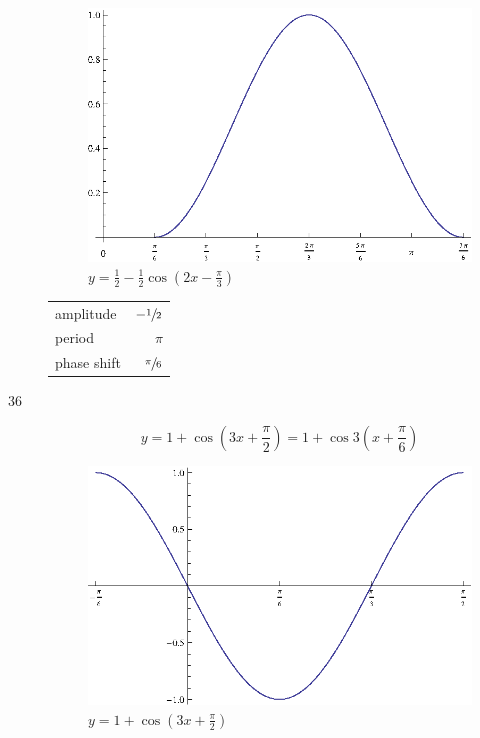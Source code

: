 \documentclass{exam}
\begin{document}
\begin{description}
        \begin{figure}[H]
          \centering
          \includegraphics[scale=1.0]{exercise35.eps}
          \caption{$y = \frac{1}{2} - \frac{1}{2} \cos \left( 2x - \frac{\pi}{3} \right)$}
        \end{figure}

        \begin{tabular}[H]{lr}
          \toprule
          amplitude   & $- \sfrac{1}{2}$ \\
          period      & $\pi$ \\
          phase shift & $\sfrac{\pi}{6}$ \\
          \bottomrule
        \end{tabular}

      \pagebreak

      \item[36]
        \[
          y = 1 + \cos \left( 3x + \frac{\pi}{2} \right) = 1 + \cos 3 \left( x + \frac{\pi}{6} \right)
        \]

        \begin{figure}[H]
          \centering
          \includegraphics[scale=1.0]{exercise36.eps}
          \caption{$y = 1 + \cos \left( 3x + \frac{\pi}{2} \right)$}
        \end{figure}


\end{description}
\end{document}

